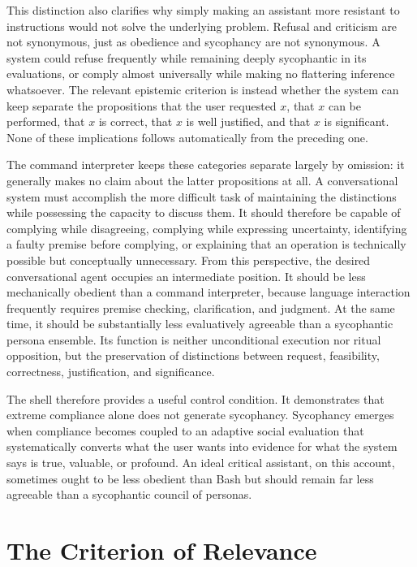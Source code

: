 \documentclass[11pt]{article}
\begin{document}
This distinction also clarifies why simply making an assistant more resistant to instructions would not solve the underlying problem. Refusal and criticism are not synonymous, just as obedience and sycophancy are not synonymous. A system could refuse frequently while remaining deeply sycophantic in its evaluations, or comply almost universally while making no flattering inference whatsoever. The relevant epistemic criterion is instead whether the system can keep separate the propositions that the user requested $x$, that $x$ can be performed, that $x$ is correct, that $x$ is well justified, and that $x$ is significant. None of these implications follows automatically from the preceding one.

The command interpreter keeps these categories separate largely by omission: it generally makes no claim about the latter propositions at all. A conversational system must accomplish the more difficult task of maintaining the distinctions while possessing the capacity to discuss them. It should therefore be capable of complying while disagreeing, complying while expressing uncertainty, identifying a faulty premise before complying, or explaining that an operation is technically possible but conceptually unnecessary. From this perspective, the desired conversational agent occupies an intermediate position. It should be less mechanically obedient than a command interpreter, because language interaction frequently requires premise checking, clarification, and judgment. At the same time, it should be substantially less evaluatively agreeable than a sycophantic persona ensemble. Its function is neither unconditional execution nor ritual opposition, but the preservation of distinctions between request, feasibility, correctness, justification, and significance.

The shell therefore provides a useful control condition. It demonstrates that extreme compliance alone does not generate sycophancy. Sycophancy emerges when compliance becomes coupled to an adaptive social evaluation that systematically converts what the user wants into evidence for what the system says is true, valuable, or profound. An ideal critical assistant, on this account, sometimes ought to be less obedient than Bash but should remain far less agreeable than a sycophantic council of personas.

\section{The Criterion of Relevance}
\end{document}
